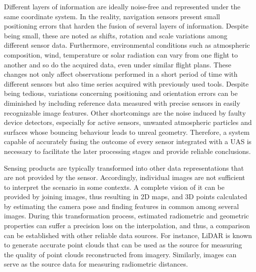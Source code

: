 Different layers of information are ideally noise-free and represented under the same coordinate system. In the reality, navigation sensors present small positioning errors that harden the fusion of several layers of information. Despite being small, these are noted as shifts, rotation and scale variations among different sensor data. Furthermore, environmental conditions such as atmospheric composition, wind, temperature or solar radiation can vary from one flight to another and so do the acquired data, even under similar flight plans. These changes not only affect observations performed in a short period of time with different sensors but also time series acquired with previously used tools. Despite being tedious, variations concerning positioning and orientation errors can be diminished by including reference data measured with precise sensors in easily recognizable image features. Other shortcomings are the noise induced by faulty device detectors, especially for active sensors, unwanted atmospheric particles and surfaces whose bouncing behaviour leads to unreal geometry. Therefore, a system capable of accurately fusing the outcome of every sensor integrated with a UAS is necessary to facilitate the later processing stages and provide reliable conclusions. 

Sensing products are typically transformed into other data representations that are not provided by the sensor. Accordingly, individual images are not sufficient to interpret the scenario in some contexts. A complete vision of it can be provided by joining images, thus resulting in 2D maps, and 3D points calculated by estimating the camera pose and finding features in common among several images. During this transformation process, estimated radiometric and geometric properties can suffer a precision loss on the interpolation, and thus, a comparison can be established with other reliable data sources. For instance, LiDAR is known to generate accurate point clouds that can be used as the source for measuring the quality of point clouds reconstructed from imagery. Similarly, images can serve as the source data for measuring radiometric distances.   

